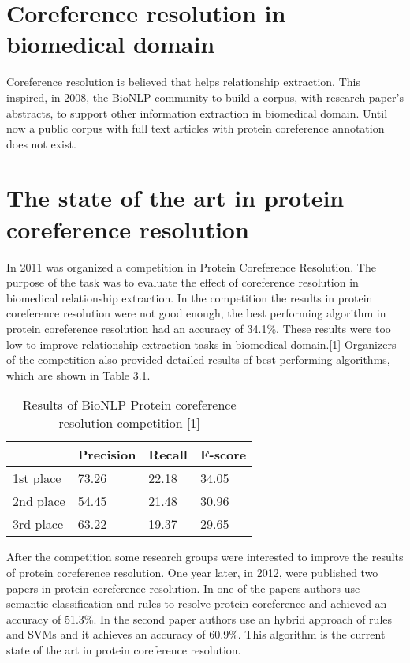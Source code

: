 \section{Coreference resolution in biomedical domain}

Coreference resolution is believed that helps relationship extraction. This inspired, in 2008, the BioNLP community to build a corpus, with research paper's abstracts, to support other information extraction in biomedical domain. Until now a public corpus with full text articles with protein coreference annotation does not exist.

\section{The state of the art in protein coreference resolution} 

In 2011 was organized a competition in Protein Coreference Resolution. The purpose of the task was to evaluate the effect of coreference resolution in biomedical relationship extraction. In the competition the results in protein coreference resolution were not good enough, the best performing algorithm in protein coreference resolution had an accuracy of 34.1\%. These results were too low to improve relationship extraction tasks in biomedical domain.[1] Organizers of the competition also provided detailed results of best performing algorithms, which are shown in Table 3.1.
\newpage
\begin{table}[h]
  \begin{center}
     \begin{tabular}{L{2.0cm} C{2.2cm} C{2.2cm} C{2.2cm}} 
	 	
  		& Precision & Recall & F-score \\ [1.1ex] 
 		\hline
 		1st place & 73.26 & 22.18 & 34.05 \\ [1.1ex]
 		\hline
 		2nd place & 54.45 & 21.48 & 30.96 \\[1.1ex]
  		\hline
 		3rd place & 63.22 & 19.37 & 29.65 \\ [1.1ex]
  		\hline
	\end{tabular}
  \end{center} 
  \caption{ Results of BioNLP Protein coreference resolution competition [1]}
  \label{table2}
\end{table}

After the competition some research groups were interested to improve the results of protein coreference resolution. One year later, in 2012, were published two papers in protein coreference resolution. In one of the papers authors use semantic classification and rules to resolve protein coreference and achieved an accuracy of 51.3\%. In the second paper authors use an hybrid approach of rules and SVMs and it achieves an accuracy of 60.9\%. This algorithm is the current state of the art in protein coreference resolution.
 
